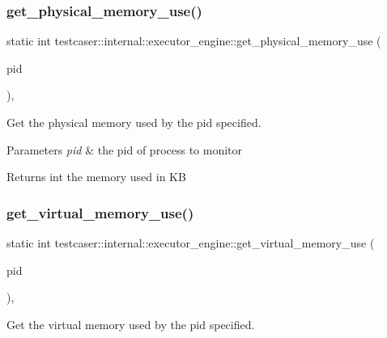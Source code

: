 \subsubsection{\texorpdfstring{get\+\_\+physical\+\_\+memory\+\_\+use()}{get\_physical\_memory\_use()}}
{\footnotesize\ttfamily static int testcaser\+::internal\+::executor\+\_\+engine\+::get\+\_\+physical\+\_\+memory\+\_\+use (\begin{DoxyParamCaption}\item[{pid\+\_\+t}]{pid }\end{DoxyParamCaption})\hspace{0.3cm}{\ttfamily [inline]}, {\ttfamily [static]}}



Get the physical memory used by the pid specified. 


\begin{DoxyParams}{Parameters}
{\em pid} & the pid of process to monitor \\
\hline
\end{DoxyParams}
\begin{DoxyReturn}{Returns}
int the memory used in KB 
\end{DoxyReturn}
\mbox{\label{structtestcaser_1_1internal_1_1executor__engine_ab70c6b9356bc0dbaf138aa017b048e8a}} 
\subsubsection{\texorpdfstring{get\+\_\+virtual\+\_\+memory\+\_\+use()}{get\_virtual\_memory\_use()}}
{\footnotesize\ttfamily static int testcaser\+::internal\+::executor\+\_\+engine\+::get\+\_\+virtual\+\_\+memory\+\_\+use (\begin{DoxyParamCaption}\item[{pid\+\_\+t}]{pid }\end{DoxyParamCaption})\hspace{0.3cm}{\ttfamily [inline]}, {\ttfamily [static]}}



Get the virtual memory used by the pid specified. 


